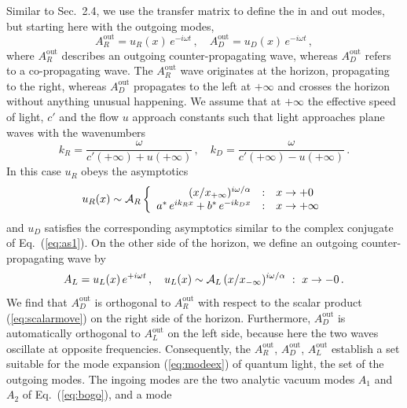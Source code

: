 \documentclass[12pt,amsmath,amssymb]{article}
\numberwithin{equation}{section}
\begin{document}
Similar to Sec.\ 2.4, we use the transfer matrix to define
the in and out modes, but starting here with the outgoing modes,
\begin{equation}
A_R^\mathrm{out} = u_R(x)\,e^{-i\omega t} \,,\quad
A_D^\mathrm{out} = u_D(x)\,e^{-i\omega t} \,,
\end{equation}
where $A_R^\mathrm{out}$ describes an outgoing
counter-propagating wave,
whereas $A_D^\mathrm{out}$ refers to a co-propagating wave.
The $A_R^\mathrm{out}$ wave originates at the horizon,
propagating to the right,
whereas $A_D^\mathrm{out}$ propagates to the left at $+\infty$
and crosses the horizon without anything unusual happening.
We assume that at $+\infty$ the effective speed of light, $c'$ and
the flow $u$ approach constants such that light
approaches plane waves with the wavenumbers
\begin{equation}
k_R = \frac{\omega}{c'(+\infty) + u(+\infty)} \,,\quad
k_D = \frac{\omega}{c'(+\infty) - u(+\infty)} \,.
\end{equation}
In this case $u_R$ obeys the asymptotics
\begin{equation}
u_R(x) \sim {\cal A}_R
\left\{
\begin{array}{r@{\quad:\quad}l}
(x/x_{+\infty})^{i\omega/\alpha} & x \rightarrow +0\\
a^*\,e^{ik_Rx} + b^*\,e^{-ik_Dx}
& x \rightarrow +\infty
\end{array}
\right.
\end{equation}
and $u_D$ satisfies the corresponding asymptotics
similar to the complex conjugate of Eq.\ (\ref{eq:as1}).
On the other side of the horizon, we define an outgoing
counter-propagating wave by
\begin{equation}
A_L = u_L(x)\,e^{+i\omega t} \,,\quad
u_L(x) \sim {\cal A}_L \,(x/x_{-\infty})^{i\omega/\alpha}
\, \,:\, \, x \rightarrow -0 \,.
\end{equation}
We find that  $A_D^\mathrm{out}$
is orthogonal to  $A_R^\mathrm{out}$ with respect to
the scalar product (\ref{eq:scalarmove}) on the right side of the
horizon. Furthermore, $A_D^\mathrm{out}$ is automatically
orthogonal to $A_L^\mathrm{out}$ on the left side,
because here the two waves oscillate at opposite frequencies.
Consequently, the $A_R^\mathrm{out}$, $A_D^\mathrm{out}$,
$A_L^\mathrm{out}$ establish a set suitable for the
mode expansion (\ref{eq:modeex}) of quantum light,
the set of the outgoing modes.
The ingoing modes are the two analytic vacuum modes
$A_1$ and $A_2$ of Eq.\  (\ref{eq:bogo}), and a mode
\end{document}
